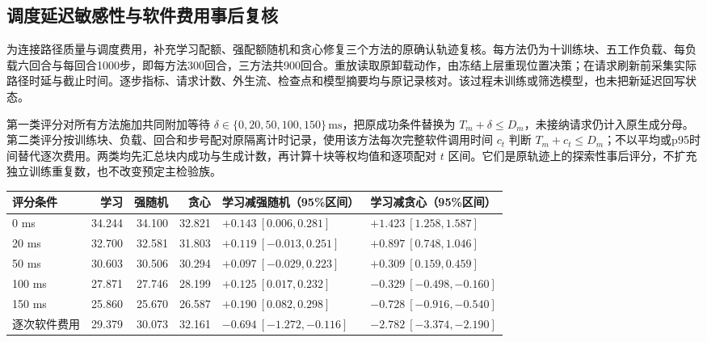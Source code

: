\subsection{调度延迟敏感性与软件费用事后复核}
\label{legacy:sec:ch5-delay-audit}

为连接路径质量与调度费用，补充学习配额、强配额随机和贪心修复三个方法的原确认轨迹复核。每方法仍为十训练块、五工作负载、每负载六回合与每回合1000步，即每方法300回合，三方法共900回合。重放读取原卸载动作，由冻结上层重现位置决策；在请求刷新前采集实际路径时延与截止时间。逐步指标、请求计数、外生流、检查点和模型摘要均与原记录核对。该过程未训练或筛选模型，也未把新延迟回写状态。

第一类评分对所有方法施加共同附加等待 $\delta\in\{0,20,50,100,150\}\,\mathrm{ms}$，把原成功条件替换为 $T_m+\delta\leq D_m$，未接纳请求仍计入原生成分母。第二类评分按训练块、负载、回合和步号配对原隔离计时记录，使用该方法每次完整软件调用时间 $c_t$ 判断 $T_m+c_t\leq D_m$；不以平均或p95时间替代逐次费用。两类均先汇总块内成功与生成计数，再计算十块等权均值和逐项配对 $t$ 区间。它们是原轨迹上的探索性事后评分，不扩充独立训练重复数，也不改变预定主检验族。

\begin{table}[!htbp]
 \centering
 \label{legacy:tab:ch5-delay-audit}
 \footnotesize
 \setlength{\tabcolsep}{3pt}
 \begin{tabular}{lrrrll}
  \toprule
  评分条件 & 学习 & 强随机 & 贪心 & 学习减强随机（95\%区间） & 学习减贪心（95\%区间） \\
  \midrule
  0 ms & 34.244 & 34.100 & 32.821 & $+0.143\ [0.006,0.281]$ & $+1.423\ [1.258,1.587]$ \\
  20 ms & 32.700 & 32.581 & 31.803 & $+0.119\ [-0.013,0.251]$ & $+0.897\ [0.748,1.046]$ \\
  50 ms & 30.603 & 30.506 & 30.294 & $+0.097\ [-0.029,0.223]$ & $+0.309\ [0.159,0.459]$ \\
  100 ms & 27.871 & 27.746 & 28.199 & $+0.125\ [0.017,0.232]$ & $-0.329\ [-0.498,-0.160]$ \\
  150 ms & 25.860 & 25.670 & 26.587 & $+0.190\ [0.082,0.298]$ & $-0.728\ [-0.916,-0.540]$ \\
  逐次软件费用 & 29.379 & 30.073 & 32.161 & $-0.694\ [-1.272,-0.116]$ & $-2.782\ [-3.374,-2.190]$ \\
  \bottomrule
 \end{tabular}
\end{table}

